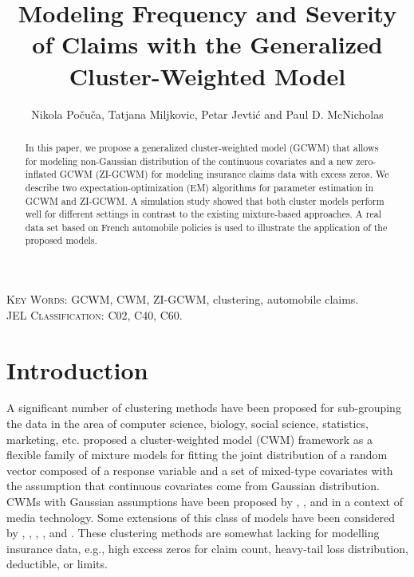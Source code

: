 \documentclass[11pt,letterpaper]{article}
\numberwithin{equation}{section}
\numberwithin{equation}{section}
\numberwithin{equation}{section}
\begin{document}
\title{Modeling  Frequency and Severity of Claims with the Generalized  Cluster-Weighted Model}

\author{Nikola Po\v cu\v ca, Tatjana Miljkovic,  Petar Jevti\' c and Paul D. McNicholas}

\maketitle
\doublespacing
\small

\begin{abstract}

In this paper, we propose a generalized cluster-weighted model (GCWM) that allows for modeling non-Gaussian distribution of the continuous covariates and a new zero-inflated GCWM (ZI-GCWM) for modeling insurance claims data with excess zeros. We describe two expectation-optimization (EM) algorithms for parameter estimation in GCWM and ZI-GCWM. A simulation study showed that both cluster models perform well for different settings in contrast to the existing mixture-based approaches. A real data set based on French automobile policies is used to illustrate the application of the proposed models.

\end{abstract}
\textsc{Key Words:} GCWM, CWM, ZI-GCWM, clustering, automobile claims.\\
\textsc{JEL Classification:}  C02, C40, C60.\\
\section{Introduction}\label{sec:introduction}
A significant number of clustering methods have been proposed for sub-grouping the data in the area of computer science, biology, social science, statistics, marketing, etc. \cite{Ingrassia+Punzo+Vittadini+Minotti:2015} proposed a cluster-weighted model (CWM) framework as a flexible family of mixture models for fitting the joint distribution of a random vector composed of a response variable and a set of mixed-type covariates with the assumption that continuous covariates come from Gaussian distribution. CWMs with Gaussian assumptions have been proposed by \cite{Gershenfeld:1997}, \cite{Gershenfeld:Schoner+Metois:1999}, and \cite{Gershenfeld:1999} in a context of media technology. Some extensions of this class of models have been considered by \cite{Punzo+Ingrassia:2015}, \cite{Ingrassia+Minotti+Punzo:2014}, \cite{Ingrassia+Minotti+Vittadini:2012}, \cite{subedi13,subedi15}, and \cite{punzo17}. These clustering methods are somewhat lacking for modelling insurance data, e.g., high excess zeros for claim count, heavy-tail loss distribution, deductible, or limits.
\end{document}

